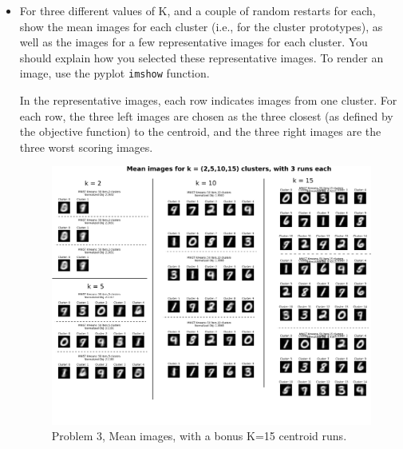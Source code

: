 \documentclass[submit]{harvardml}
\newenvironment{answer}{%
\color{answergreen}\sffamily\large}{}
\begin{document}
\begin{itemize}
\begin{answer}
\end{answer}

\item For three different values of K, and a couple of random restarts for each, show the mean
    images for each cluster (i.e., for the cluster prototypes), as well as the images for a few
    representative images for each cluster. You should explain how you selected these representative
    images. To render an image, use the pyplot \texttt{imshow} function. 

\begin{answer}

In the representative images, each row indicates images from one cluster.
For each row, the three left images are chosen as the three closest (as defined
by the objective function) to the centroid, and the three right images are the three worst scoring images.

\begin{figure}[h]
        \centering
        \includegraphics[width=\textwidth,height=0.28\paperheight]{p3_means.png}
        \caption{Problem 3, Mean images, with a bonus K=15 centroid runs.}
        \label{P3 Means}


\end{figure}
\end{answer}
\end{itemize}
\end{document}
